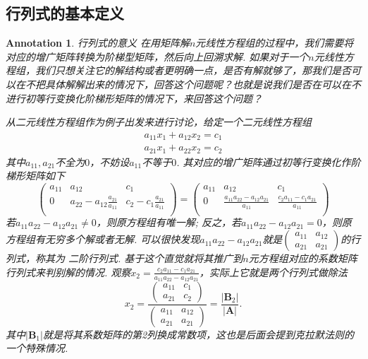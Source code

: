 \documentclass{article}
\newtheorem{annotation}[theorem]{Annotation}
\newcommand{\mbf}[1]{\mathbf{#1}}
\begin{document}
\subsection{行列式的基本定义}
\begin{annotation}
\rm {\color{red} 行列式的意义} 在用矩阵解$n$元线性方程组的过程中，我们需要将对应的增广矩阵转换为阶梯型矩阵，然后向上回溯求解. 如果对于一个$n$元线性方程组，我们只想关注它的解结构或者更明确一点，是否有解就够了，那我们是否可以在不把具体解解出来的情况下，回答这个问题呢？也就是说我们是否在可以在不进行初等行变换化阶梯形矩阵的情况下，来回答这个问题？

从二元线性方程组作为例子出发来进行讨论，给定一个二元线性方程组
$$
\begin{array}{ll}
a_{11}x_1 + a_{12}x_2 = c_1 \\
a_{21}x_1 + a_{22}x_2 = c_2
\end{array}
$$
其中$a_{11},a_{21}$不全为$0$，不妨设$a_{11}$不等于$0$. 其对应的增广矩阵通过初等行变换化作阶梯形矩阵如下
$$
\begin{pmatrix}
a_{11} & a_{12} & c_1 \\
0 & a_{22}-a_{12}\frac{a_{21}}{a_{11}} & c_2 -c_1\frac{a_{21}}{a_{11}} \\
\end{pmatrix}
=
\begin{pmatrix}
a_{11} & a_{12} & c_1 \\ 
0 & \frac{a_{11}a_{22}-a_{12}a_{21}}{a_{11}} & \frac{c_2a_{11}-c_1a_{21}}{a_{11}} \\
\end{pmatrix}
$$
若$a_{11}a_{22}-a_{12}a_{21} \neq 0$，则原方程组有唯一解; 反之，若$a_{11}a_{22}-a_{12}a_{21} = 0$，则原方程组有无穷多个解或者无解. 可以很快发现$a_{11}a_{22}-a_{12}a_{21}$就是$\begin{pmatrix}
a_{11} & a_{12} \\
a_{21} & a_{21} 
\end{pmatrix}$的行列式，称其为{\color{red} 二阶行列式}. 基于这个直觉就将其推广到$n$元方程组对应的系数矩阵行列式来判别解的情况. 观察$x_2 = \frac{c_2a_{11}-c_1a_{21}}{a_{11}a_{22}-a_{12}a_{21}}$，实际上它就是两个行列式做除法
$$
x_2 = \frac{\begin{pmatrix}
a_{11} & c_1\\
a_{21} & c_2 
\end{pmatrix}}{\begin{pmatrix}
a_{11} & a_{12} \\
a_{21} & a_{21} 
\end{pmatrix}}
=\frac{|\mbf{B}_2|}{|\mbf{A}|}.
$$
其中$|\mbf{B}_1|$就是将其系数矩阵的第2列换成常数项，这也是后面会提到{\color{red}克拉默法则}的一个特殊情况.
\end{annotation}
\end{document}
